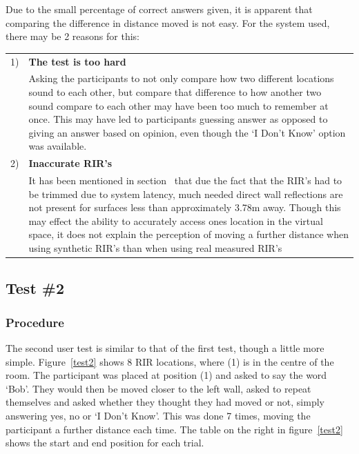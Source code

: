 \documentclass[../../main.tex]{subfiles}
\begin{document}

			Due to the small percentage of correct answers given, it is apparent that comparing the difference in distance moved is not easy. For the system used, there may be 2 reasons for this:

			\begin{tabular}{l p{} }
			1) & \textbf{The test is too hard} \\
			& Asking the participants to not only compare how two different locations sound to each other, but compare that difference to how another two sound compare to each other may have been too much to remember at once. This may have led to participants guessing answer as opposed to giving an answer based on opinion, even though the `I Don't Know' option was available. \\
			2) & \textbf{Inaccurate \ac{RIR}'s} \\
			& It has been mentioned in section~\fullref{RIRtrimming} that due the fact that the \ac{RIR}'s had to be trimmed due to system latency, much needed direct wall reflections are not present for surfaces less than approximately 3.78m away. Though this may effect the ability to accurately access ones location in the virtual space, it does not explain the perception of moving a further distance when using synthetic \ac{RIR}'s than when using real measured \ac{RIR}'s\\
			\end{tabular}

		\subsection{Test \#2}

			\subsubsection{Procedure}
				The second user test is similar to that of the first test, though a little more simple. Figure~\ref{test2} shows 8 \ac{RIR} locations, where (1) is in the centre of the room. The participant was placed at position (1) and asked to say the word `Bob'. They would then be moved closer to the left wall, asked to repeat themselves and asked whether they thought they had moved or not, simply answering yes, no or `I Don't Know'. This was done 7 times, moving the participant a further distance each time. The table on the right in figure~\ref{test2} shows the start and end position for each trial.
\end{document}
